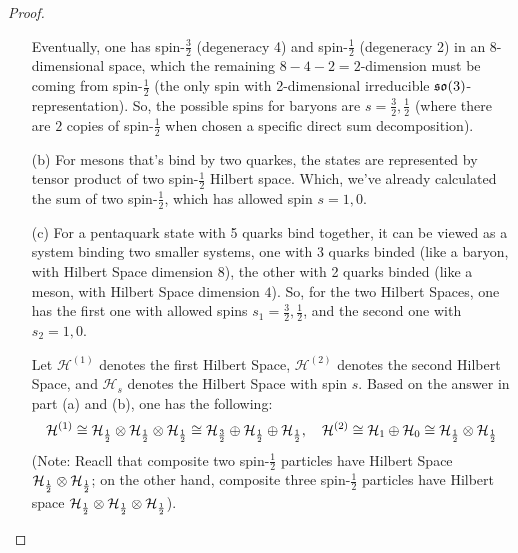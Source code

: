 \documentclass{article}
\begin{document}
\begin{proof}
\begin{itemize}
        \hfil

        Eventually, one has spin-$\frac{3}{2}$ (degeneracy 4) and spin-$\frac{1}{2}$ (degeneracy 2) in an $8$-dimensional space, which the remaining $8-4-2=2$-dimension must be coming from spin-$\frac{1}{2}$ (the only spin with 2-dimensional irreducible $\so(3)$-representation). So, the possible spins for baryons are $s = \frac{3}{2},\frac{1}{2}$ (where there are $2$ copies of spin-$\frac{1}{2}$ when chosen a specific direct sum decomposition).

        \hfil

        \hfil

        \item[(b)] For mesons that's bind by two quarkes, the states are represented by tensor product of two spin-$\frac{1}{2}$ Hilbert space. Which, we've already calculated the sum of two spin-$\frac{1}{2}$, which has allowed spin $s=1,0$.
        
        \hfil

        \hfil

        \item[(c)] For a pentaquark state with 5 quarks bind together, it can be viewed as a system binding two smaller systems, one with 3 quarks binded (like a baryon, with Hilbert Space dimension $8$), the other with 2 quarks binded (like a meson, with Hilbert Space dimension $4$). So, for the two Hilbert Spaces, one has the first one with allowed spins $s_1 = \frac{3}{2},\frac{1}{2}$, and the second one with $s_2 = 1,0$.
        
        Let $\mathcal{H}^{(1)}$ denotes the first Hilbert Space, $\mathcal{H}^{(2)}$ denotes the second Hilbert Space, and $\mathcal{H}_s$ denotes the Hilbert Space with spin $s$. Based on the answer in part (a) and (b), one has the following:
        \begin{align}
            \mathcal{H}^{(1)} \cong \mathcal{H}_{\frac{1}{2}}\otimes\mathcal{H}_{\frac{1}{2}}\otimes \mathcal{H}_{\frac{1}{2}} \cong \mathcal{H}_{\frac{3}{2}}\oplus\mathcal{H}_{\frac{1}{2}}\oplus \mathcal{H}_{\frac{1}{2}},\quad \mathcal{H}^{(2)} \cong \mathcal{H}_{1}\oplus \mathcal{H}_{0}\cong \mathcal{H}_{\frac{1}{2}}\otimes \mathcal{H}_{\frac{1}{2}}
        \end{align}
        (Note: Reacll that composite two spin-$\frac{1}{2}$ particles have Hilbert Space $\mathcal{H}_{\frac{1}{2}}\otimes \mathcal{H}_{\frac{1}{2}}$; on the other hand, composite three spin-$\frac{1}{2}$ particles have Hilbert space $\mathcal{H}_{\frac{1}{2}}\otimes\mathcal{H}_{\frac{1}{2}}\otimes \mathcal{H}_{\frac{1}{2}}$).


\end{itemize}
\end{proof}
\end{document}
